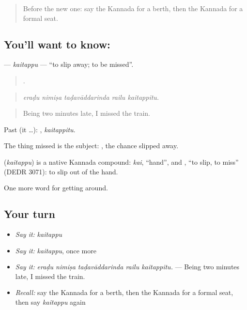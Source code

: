 \label{lesson:KA-C435-kaitappu}



\begin{quote}
Before the new one: say the Kannada for a berth, then the Kannada for a formal seat.
\end{quote}

\subsection*{You'll want to know: }
\textbf{} — \emph{kaitappu} — \textquotedblleft{}to slip away; to be missed\textquotedblright{}.

\begin{quote}
    .
\end{quote}

\begin{quote}
\emph{eraḍu nimiṣa taḍavāddarinda railu kaitappitu.}
\end{quote}

\begin{quote}
Being two minutes late, I missed the train.
\end{quote}

Past (it …): , \emph{kaitappitu}.

The thing missed is the subject:  , the chance slipped away.

\begin{cousinweb}
\textbf{} (\emph{kaitappu}) is a native Kannada compound: \emph{kai}, \textquotedblleft{}hand\textquotedblright{}, and , \textquotedblleft{}to slip, to miss\textquotedblright{} (DEDR 3071): to slip out of the hand.
\end{cousinweb}

\begin{grammarlens}[title={What you've built}]
One more word for getting around.
\end{grammarlens}

\subsection*{Your turn}
\begin{itemize}
\raggedright
  \item \emph{Say it:} \emph{kaitappu}
  \item \emph{Say it:} \emph{kaitappu}, once more
  \item \emph{Say it:} \emph{eraḍu nimiṣa taḍavāddarinda railu kaitappitu.} — Being two minutes late, I missed the train.
  \item \emph{Recall:} say the Kannada for a berth, then the Kannada for a formal seat, then say \emph{kaitappu} again
\end{itemize}

